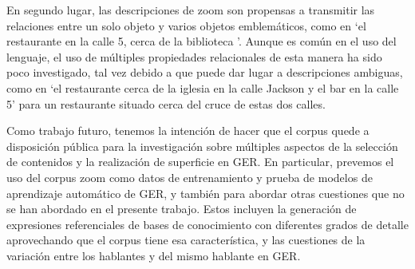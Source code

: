 En segundo lugar, las descripciones de zoom son propensas a transmitir las relaciones entre un solo objeto y varios objetos emblem\'aticos, como en `el restaurante en la calle 5, cerca de la biblioteca '. Aunque es com\'un en el uso del lenguaje, el uso de m\'ultiples propiedades relacionales de esta manera ha sido poco investigado, tal vez debido a que puede dar lugar a descripciones ambiguas, como en `el restaurante cerca de la iglesia en la calle Jackson y el bar en la calle 5' para un restaurante situado cerca del cruce de estas dos calles.

Como trabajo futuro, tenemos la intenci\'on de hacer que el corpus quede a disposici\'on p\'ublica para la investigaci\'on sobre m\'ultiples aspectos de la selecci\'on de contenidos y la realizaci\'on de superficie en GER. En particular, prevemos el uso del corpus zoom como datos de entrenamiento y prueba de modelos de aprendizaje autom\'atico de GER, y tambi\'en para abordar otras cuestiones que no se han abordado en el presente trabajo. Estos incluyen la generaci\'on de expresiones referenciales de bases de conocimiento con diferentes grados de detalle aprovechando que el corpus tiene esa caracter\'istica, y las cuestiones de la variaci\'on entre los hablantes y del mismo hablante en GER.


 

